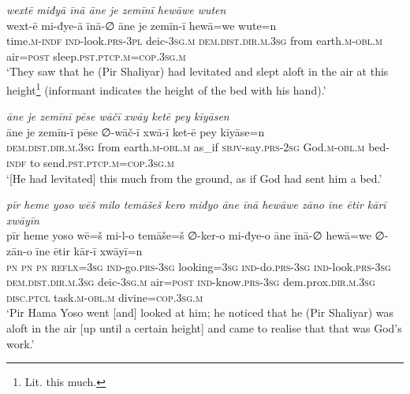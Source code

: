 \ea \label{ŽP.68}
\textit{wextē miđyā īnā āne je zemīnī hewāwe wuten} \\ 
\gll wext-ē mi-đye-ā īnā-∅ āne je zemīn-ī hewā=we wute=n \\ 
 time\textsc{.m}\textsc{-indf} \textsc{ind-}look\textsc{.prs}\textsc{-3pl} deic\textsc{-3sg}\textsc{.m} \textsc{dem.dist}\textsc{.dir}\textsc{.m}\textsc{.3sg} from earth\textsc{.m}\textsc{-obl}\textsc{.m} air\textsc{=\textsc{post}} sleep\textsc{.pst}\textsc{.ptcp}\textsc{.m}\textsc{=cop}\textsc{.3sg}\textsc{.m} \\ 
\glt `They saw that he (Pir Shaliyar) had levitated and slept aloft in the air at this height\footnote{Lit. this much.} (informant indicates the height of the bed with his hand).'
\z 
 
\ea \label{ŽP.69}
\textit{āne je zemīnī pēse wāčī xwāy ketē pey kīyāsen} \\ 
\gll āne je zemīn-ī pēse ∅-wāč-ī xwā-ī ket-ē pey kīyāse=n \\ 
 \textsc{dem.dist}\textsc{.dir}\textsc{.m}\textsc{.3sg} from earth\textsc{.m}\textsc{-obl}\textsc{.m} as\_if \textsc{sbjv-}say\textsc{.prs-}\textsc{2sg} God\textsc{.m}\textsc{-obl}\textsc{.m} bed\textsc{-indf} to send\textsc{.pst}\textsc{.ptcp}\textsc{.m}\textsc{=cop}\textsc{.3sg}\textsc{.m} \\ 
\glt `[He had levitated] this much from the ground, as if God had sent him a bed.'
\z 
 
\ea \label{ŽP.71}
\textit{pīr heme yoso wēš milo temāšeš kero miđyo āne īnā hewāwe zāno īne ētir kārī xwāyīn} \\ 
\gll pīr heme yoso wē=š mi-l-o temāše=š ∅-ker-o mi-đye-o āne īnā-∅ hewā=we ∅-zān-o īne ētir kār-ī xwāyī=n \\ 
 \textsc{pn} \textsc{pn} \textsc{pn} \textsc{reflx}\textsc{=3sg} \textsc{ind-}go\textsc{.prs}\textsc{-3sg} looking\textsc{=3sg} \textsc{ind-}do\textsc{.prs}\textsc{-3sg} \textsc{ind-}look\textsc{.prs}\textsc{-3sg} \textsc{dem.dist}\textsc{.dir}\textsc{.m}\textsc{.3sg} deic\textsc{-3sg}\textsc{.m} air\textsc{=\textsc{post}} \textsc{ind-}know\textsc{.prs}\textsc{-3sg} dem.prox\textsc{.dir}\textsc{.m}\textsc{.3sg} \textsc{disc.ptcl} task\textsc{.m}\textsc{-obl}\textsc{.m} divine\textsc{=cop}\textsc{.3sg}\textsc{.m} \\ 
\glt `Pir Hama Yoso went [and] looked at him; he noticed that he (Pir Shaliyar) was aloft in the air [up until a certain height] and came to realise that that was God’s work.'
\z 
 
